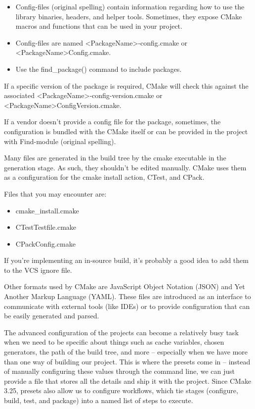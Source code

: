 \begin{itemize}
\item
Config-files (original spelling) contain information regarding how to use the library binaries, headers, and helper tools. Sometimes, they expose CMake macros and functions that can be used in your project.

\item
Config-files are named <PackageName>-config.cmake or <PackageName>Config.cmake.

\item
Use the find\_package() command to include packages.
\end{itemize}

If a specific version of the package is required, CMake will check this against the associated <PackageName>-config-version.cmake or <PackageName>ConfigVersion.cmake.

If a vendor doesn’t provide a config file for the package, sometimes, the configuration is bundled with the CMake itself or can be provided in the project with Find-module (original spelling).


Many files are generated in the build tree by the cmake executable in the generation stage. As such, they shouldn’t be edited manually. CMake uses them as a configuration for the cmake install action, CTest, and CPack.

Files that you may encounter are:

\begin{itemize}
\item
cmake\_install.cmake

\item
CTestTestfile.cmake

\item
CPackConfig.cmake
\end{itemize}

If you’re implementing an in-source build, it’s probably a good idea to add them to the VCS ignore file.


Other formats used by CMake are JavaScript Object Notation (JSON) and Yet Another Markup Language (YAML). These files are introduced as an interface to communicate with external tools (like IDEs) or to provide configuration that can be easily generated and parsed.


The advanced configuration of the projects can become a relatively busy task when we need to be specific about things such as cache variables, chosen generators, the path of the build tree, and more – especially when we have more than one way of building our project. This is where the presets come in – instead of manually configuring these values through the command line, we can just provide a file that stores all the details and ship it with the project. Since CMake 3.25, presets also allow us to configure workflows, which tie stages (configure, build, test, and package) into a named list of steps to execute.

